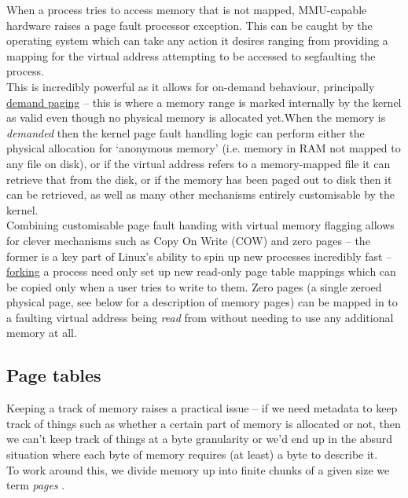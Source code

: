 When a process tries to access memory that is not mapped, MMU-capable hardware
raises a  page fault processor exception. This can be caught
by the operating system which can take any action it desires ranging from
providing a mapping for the virtual address attempting to be accessed to
segfaulting the process.\\

This is incredibly powerful as it allows for on-demand behaviour, principally
\href{https://en.wikipedia.org/wiki/Demand_paging}{demand paging} -- this is
where a memory range is marked internally by the kernel as valid even though no
physical memory is allocated yet.When the memory is \emph{demanded} then the
kernel page fault handling logic can perform either the physical allocation for
`anonymous memory'  (i.e. memory in RAM not mapped to
any file on disk), or if the virtual address refers to a memory-mapped file it
can retrieve that from the disk, or if the memory has been paged out to disk
then it can be retrieved, as well as many other mechanisms entirely customisable
by the kernel.\\

Combining customisable page fault handing with virtual memory flagging allows
for clever mechanisms such as  Copy On Write (COW) and
 zero pages -- the former is a key part of Linux's ability to
spin up new processes incredibly fast -- 
\href{https://en.wikipedia.org/wiki/Fork_(system_call)}{forking} a process need
only set up new read-only page table mappings which can be copied only when a
user tries to write to them. Zero pages (a single zeroed physical page, see
below for a description of memory pages) can be mapped in to a faulting virtual
address being \emph{read} from without needing to use any additional memory at
all.\\

\subsection{Page tables}
 Keeping a track of memory raises a practical issue -- if we
need metadata to keep track of things such as whether a certain part of memory
is allocated or not, then we can't keep track of things at a byte granularity or
we'd end up in the absurd situation where each byte of memory requires (at
least) a byte to describe it.\\

To work around this, we divide memory up into finite chunks of a given size we
term \emph{pages} .\\


